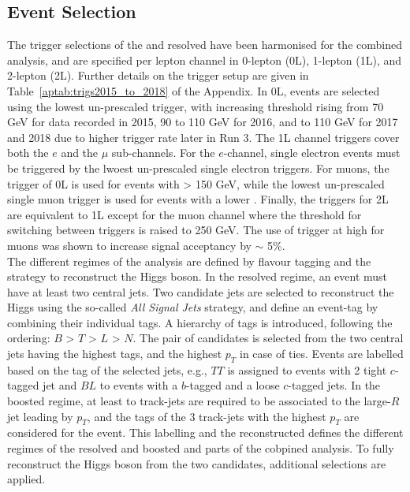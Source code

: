 \subsection{Event Selection}\label{sec-regimeCat}
The trigger selections of the \vhb and \vhc resolved have been harmonised for the combined analysis, and are specified per lepton channel in 0-lepton (0L), 1-lepton (1L), and 2-lepton (2L). Further details on the trigger setup are given in Table~\ref{aptab:trigs2015_to_2018} of the Appendix. In 0L, events are selected using the lowest un-prescaled \etm trigger, with increasing threshold rising from 70 GeV for data recorded in 2015, 90 to 110 GeV for 2016, and to 110 GeV for 2017 and 2018 due to higher trigger rate later in Run 3. The 1L channel triggers cover both the $e$ and the $\mu$ sub-channels. For the $e$-channel, single electron events must be triggered by the lwoest un-prescaled single electron triggers. For muons, the \etm trigger of 0L is used for events with \ptv > 150 GeV, while the lowest un-prescaled single muon trigger is used for events with a lower \ptv. Finally, the triggers for 2L are equivalent to 1L except for the muon channel where the \ptv threshold for switching between triggers is raised to 250 GeV. The use of \etm trigger at high \ptv for muons was shown to increase signal acceptancy by $\sim$ 5\%.\\


The different regimes of the analysis are defined by flavour tagging and the strategy to reconstruct the Higgs boson. In the resolved regime, an event must have at least two central jets. Two candidate jets are selected to reconstruct the Higgs using the so-called \textit{All Signal Jets} strategy, and define an event-tag by combining their individual tags. A hierarchy of tags is introduced, following the ordering: $B$ > $T$ > $L$ > $N$. The pair of candidates is selected from the two central jets having the highest tags, and the highest $p_T$ in case of ties. Events are labelled based on the tag of the selected jets, e.g., $TT$ is assigned to events with 2 tight $c$-tagged jet and $BL$ to events with a $b$-tagged and a loose $c$-tagged jets. In the boosted regime, at least to track-jets are required to be associated to the large-$R$ jet leading by $p_T$, and the tags of the 3 track-jets with the highest $p_T$ are considered for the event. This labelling and the reconstructed \ptv defines the different regimes of the resolved and boosted \vhb and \vhc parts of the cobpined analysis. To fully reconstruct the Higgs boson from the two candidates, additional selections are applied.

